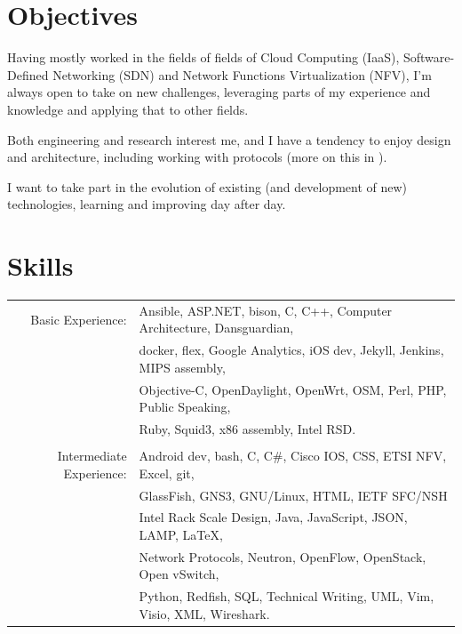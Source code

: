 \documentclass[letter,10pt]{article} %
\begin{document}

\section{Objectives}

Having mostly worked in the fields of fields of Cloud Computing (IaaS), Software-Defined Networking (SDN) and Network Functions Virtualization (NFV), I'm always open to take on new challenges, leveraging parts of my experience and knowledge and applying that to other fields.

Both engineering and research interest me, and I have a tendency to enjoy design and architecture, including working with protocols (more on this in ).

I want to take part in the evolution of existing (and development of new) technologies, learning and improving day after day. \\


\section{Skills}

\begin{tabular}{rl}
Basic Experience:
& Ansible, ASP.NET, bison, C, C++, Computer Architecture, Dansguardian, \\
& docker, flex, Google Analytics, iOS dev, Jekyll, Jenkins, MIPS assembly, \\
& Objective-C, OpenDaylight, OpenWrt, OSM, Perl, PHP, Public Speaking, \\
& Ruby, Squid3, x86 assembly, Intel RSD. \\
& \\
Intermediate Experience:
& Android dev, bash, C, C\#, Cisco IOS, CSS, ETSI NFV, Excel, git, \\
& GlassFish, GNS3, GNU/Linux, HTML, IETF SFC/NSH \\
& Intel Rack Scale Design, Java, JavaScript, JSON, LAMP, {\LaTeX}, \\
& Network Protocols, Neutron, OpenFlow, OpenStack, Open vSwitch, \\
& Python, Redfish, SQL, Technical Writing, UML, Vim, Visio, XML, Wireshark. \\
\end{tabular} \\
\end{document}
